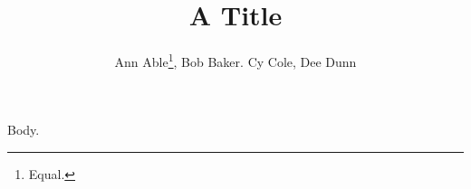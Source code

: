 \documentclass{article}
\title{A Title}
\author{Ann Able\thanks{Equal.}, Bob Baker\footnotemark[1]. Cy Cole, Dee Dunn}
\begin{document}
\maketitle
Body.
\end{document}

